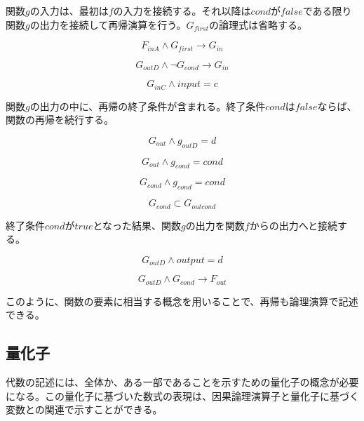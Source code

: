 \documentclass[12pt]{article}
\begin{document}
関数\(g\)の入力は、最初は\(f\)の入力を接続する。それ以降は\(cond\)が\(false\)である限り関数\(g\)の出力を接続して再帰演算を行う。\(G_{first}\)の論理式は省略する。

\begin{equation} F_{inA} \wedge G_{first} \rightarrow G_{in}\end{equation}

\begin{equation} G_{outD} \wedge \neg G_{cond} \rightarrow G_{in}\end{equation}

\begin{equation} G_{inC} \wedge input = c\end{equation}

関数\(g\)の出力の中に、再帰の終了条件が含まれる。終了条件\(cond\)は\(false\)ならば、関数の再帰を続行する。

\begin{equation} G_{out} \wedge g_{outD} = d\end{equation}

\begin{equation} G_{out} \wedge g_{cond} = cond\end{equation}

\begin{equation} G_{cond} \wedge g_{cond} = cond\end{equation}

\begin{equation} G_{cond} \subset G_{outcond}\end{equation}

終了条件\(cond\)が\(true\)となった結果、関数\(g\)の出力を関数\(f\)からの出力へと接続する。

\begin{equation} G_{outD} \wedge output = d\end{equation}

\begin{equation} G_{outD} \wedge G_{cond} \rightarrow F_{out}\end{equation}

このように、関数の要素に相当する概念を用いることで、再帰も論理演算で記述できる。

\subsection{量化子}\label{ux91cfux5316ux5b50}

代数の記述には、全体か、ある一部であることを示すための量化子の概念が必要になる。この量化子に基づいた数式の表現は、因果論理演算子と量化子に基づく変数との関連で示すことができる。
\end{document}
